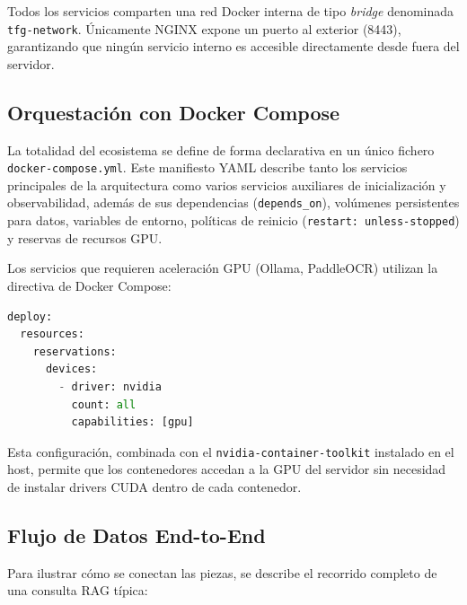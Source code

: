 Todos los servicios comparten una red Docker interna de tipo \textit{bridge} denominada \texttt{tfg-network}. Únicamente NGINX expone un puerto al exterior (8443), garantizando que ningún servicio interno es accesible directamente desde fuera del servidor.

\subsection{Orquestación con Docker Compose}

La totalidad del ecosistema se define de forma declarativa en un único fichero \texttt{docker-compose.yml}. Este manifiesto YAML describe tanto los servicios principales de la arquitectura como varios servicios auxiliares de inicialización y observabilidad, además de sus dependencias (\texttt{depends\_on}), volúmenes persistentes para datos, variables de entorno, políticas de reinicio (\texttt{restart: unless-stopped}) y reservas de recursos GPU.

Los servicios que requieren aceleración GPU (Ollama, PaddleOCR) utilizan la directiva de Docker Compose:

\begin{lstlisting}[language=Python, caption={Reserva de GPU en Docker Compose.}]
deploy:
  resources:
    reservations:
      devices:
        - driver: nvidia
          count: all
          capabilities: [gpu]
\end{lstlisting}

Esta configuración, combinada con el \texttt{nvidia-container-toolkit} instalado en el host, permite que los contenedores accedan a la GPU del servidor sin necesidad de instalar drivers CUDA dentro de cada contenedor.

\subsection{Flujo de Datos End-to-End}

Para ilustrar cómo se conectan las piezas, se describe el recorrido completo de una consulta RAG típica:

